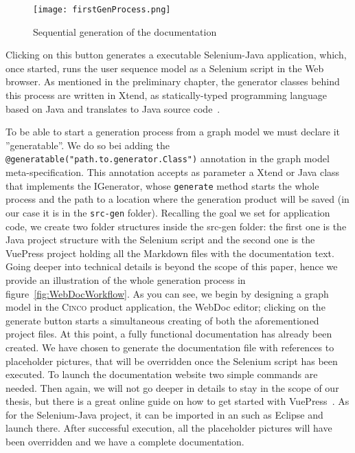 \begin{figure}[h]
    \centering
    \texttt{[image: firstGenProcess.png]}
    \caption{Sequential generation of the documentation}
    \label{fig:firstGenProcess}
\end{figure}

Clicking on this button generates a executable Selenium-Java application, which, once started, runs the user sequence model  as a Selenium script in the Web browser. As mentioned in the preliminary chapter, the generator classes behind this process are written in Xtend, as statically-typed programming language based on Java and translates to Java source code~\cite{Xtend}. 

To be able to start a generation process from a graph model we must declare it ''generatable''. We do so bei adding the \lstinline[language=MGL]{@generatable("path.to.generator.Class")} annotation in the graph model meta-specification. This annotation accepts as parameter a Xtend or Java class that implements the IGenerator, whose \lstinline{generate} method starts the whole process and the path to a location where the generation product will be saved (in our case it is in the \lstinline{src-gen} folder). Recalling the goal we set for application code, we create two folder structures inside the src-gen folder: the first one is the Java project structure with the Selenium script and the second one is the VuePress project holding all the Markdown files with the documentation text. Going deeper into technical details is beyond the scope of this paper, hence we provide an illustration of the whole generation process in figure~\ref{fig:WebDocWorkflow}. As you can see, we begin by designing a graph model in the \textsc{Cinco} product application, the WebDoc editor; clicking on the generate button starts a simultaneous creating of both the aforementioned project files. At this point, a fully functional documentation has already been created. We have chosen to generate the documentation file with references to placeholder pictures, that will be overridden once the Selenium script has been executed. To launch the documentation website two simple commands are needed. Then again, we will not go deeper in details to stay in the scope of our thesis, but there is a great online guide on how to get started with VuePress~\cite{vuepress}. As for the Selenium-Java project, it can be imported in an  such as Eclipse and launch there. After successful execution, all the placeholder pictures will have been overridden and we have a complete documentation.